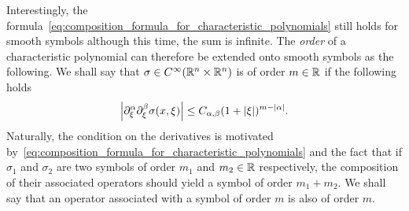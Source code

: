Interestingly, the formula~\eqref{eq:composition_formula_for_characteristic_polynomials} still holds for smooth symbols
although this time, the sum is infinite.
The \emph{order} of a characteristic polynomial can therefore be extended onto smooth symbols as the following.
We shall say that $\sigma \in {C^\infty(\mathbb{R}^n \times \mathbb{R}^n)}$ is of order $m \in \mathbb{R}$
if the following holds
\begin{align*}
    \abs {\iD{\xi^\alpha, \xi^\beta} \sigma(x, \xi)} \leq C_{\alpha, \beta} (1 + \abs \xi)^{m - \abs \alpha}.
\end{align*}
Naturally, the condition on the derivatives is motivated by~\eqref{eq:composition_formula_for_characteristic_polynomials} and the fact that
if $\sigma_1$ and $\sigma_2$ are two symbols of order $m_1$ and $m_2 \in \mathbb{R}$ respectively,
the composition of their associated operators should yield a symbol of order $m_1 + m_2$.
We shall say that an operator associated with a symbol of order $m$ is also of order $m$.
